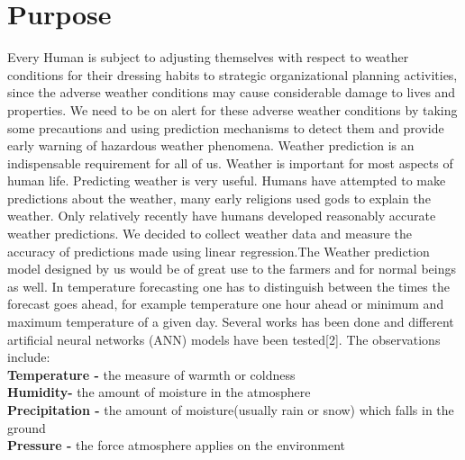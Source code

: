 \section{Purpose}
Every Human is subject  to  adjusting  themselves  with  respect  to  weather  conditions  for  their dressing habits to  strategic organizational  planning  activities,  since the  adverse weather conditions may cause considerable damage to lives and properties. We need to be on alert for these adverse weather conditions by taking some precautions and using prediction mechanisms to detect them and provide early warning of hazardous weather phenomena. Weather prediction is an indispensable requirement for all of us. Weather is important for most aspects of human life.  Predicting weather is very useful.  Humans have attempted to make predictions about the weather, many early religions used gods to explain the weather.  Only relatively recently have humans developed reasonably accurate weather predictions.    We decided to collect weather  data  and  measure  the accuracy of predictions made using linear regression.The Weather prediction model designed by us would be of great use to the farmers and for normal beings as well. In temperature forecasting one has to distinguish between the times the forecast goes ahead, for example temperature one hour ahead or minimum and maximum temperature of a given day. Several works has been done and different artificial neural networks (ANN) models have been tested[2]. The observations include: 
\\
\textbf{Temperature -}
the measure of warmth or coldness
\\
\textbf{Humidity-}
the amount of moisture in the atmosphere
\\
\textbf{Precipitation -}
the amount of moisture(usually rain or snow) which falls in the ground
\\
\textbf{Pressure -}
the force atmosphere applies on the environment
\\
\\
\\
\\


